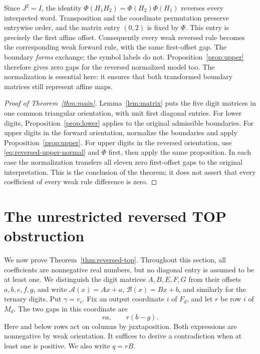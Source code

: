 \documentclass[11pt,a4paper]{article}
\begin{document}
Since $J^2=I$, the identity
$\Phi(H_1H_2)=\Phi(H_2)\Phi(H_1)$ reverses every interpreted word.
Transposition and the coordinate permutation preserve entrywise order,
and the matrix entry $(0,2)$ is fixed by $\Phi$. This entry is precisely
the first affine offset. Consequently every weak reversed rule becomes
the corresponding weak forward rule, with the same first-offset gap.
The boundary \emph{forms} exchange; the symbol labels do not.
Proposition~\ref{prop:upper} therefore gives zero gaps for the reversed
normalized model too. The normalization is essential here: it ensures
that both transformed boundary matrices still represent affine maps.

\begin{proof}[Proof of Theorem~\ref{thm:main}]
Lemma~\ref{lem:matrix} puts the five digit matrices in one common
triangular orientation, with unit first diagonal entries. For lower
digits, Proposition~\ref{prop:lower} applies to the original admissible
boundaries. For upper digits in the forward orientation, normalize the
boundaries and apply Proposition~\ref{prop:upper}. For upper digits in
the reversed orientation, use \eqref{eq:reversed-upper-normal} and
$\Phi$ first, then apply the same proposition. In each case the
normalization transfers all eleven zero first-offset gaps to the
original interpretation. This is the conclusion of the theorem; it
does not assert that every coefficient of every weak rule difference
is zero.
\end{proof}

\section{The unrestricted reversed TOP obstruction}
\label{sec:reversed-top}

We now prove Theorem~\ref{thm:reversed-top}. Throughout this section,
all coefficients are nonnegative real numbers, but no diagonal entry
is assumed to be at least one. We distinguish the digit matrices
$A,B,E,F,G$ from their offsets $a,b,e,f,g$, and write
$\mathcal A(x)=Ax+a$, $\mathcal B(x)=Bx+b$, and similarly for the
ternary digits. Put $\gamma=v_c$. Fix an output coordinate $i$ of
$F_d$, and let $r$ be row $i$ of $M_d$. The two gaps in this coordinate are
\begin{equation}\label{eq:top-gaps}
ra,\qquad r(b-g).
\end{equation}
Here and below rows act on columns by juxtaposition. Both expressions
are nonnegative by weak orientation. It suffices to derive a
contradiction when at least one is positive. We also write $q=rB$.
\end{document}
